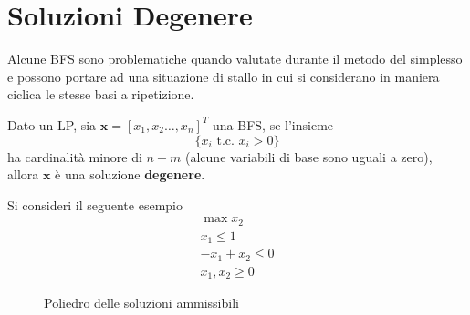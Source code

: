 \documentclass[10pt, letterpaper]{report}
\begin{document}
\section{Soluzioni Degenere}
Alcune BFS sono problematiche quando valutate durante il metodo del simplesso e possono portare ad una situazione di stallo in cui si considerano in maniera ciclica le stesse basi a ripetizione. 
\begin{definizione}
    Dato un LP, sia $\mathbf x=[x_1,x_2\dots,x_n]^T$ una BFS, se l'insieme 
    $$\{x_i \text{ t.c. }x_i>0\}$$
    ha cardinalità minore di $n-m$ (alcune variabili di base sono uguali a zero), allora $\mathbf x$ è una soluzione \textbf{degenere}.
\end{definizione}
Si consideri il seguente esempio 
\begin{equation}
    \begin{matrix}
        \max x_2 \\ x_1\le 1\\
        -x_1+x_2\le 0 \\ 
        x_1,x_2 \ge 0 
    \end{matrix} \text{}
\end{equation}
\begin{figure}[h]
    \caption{Poliedro delle soluzioni ammissibili}
\end{figure}
\end{document}
